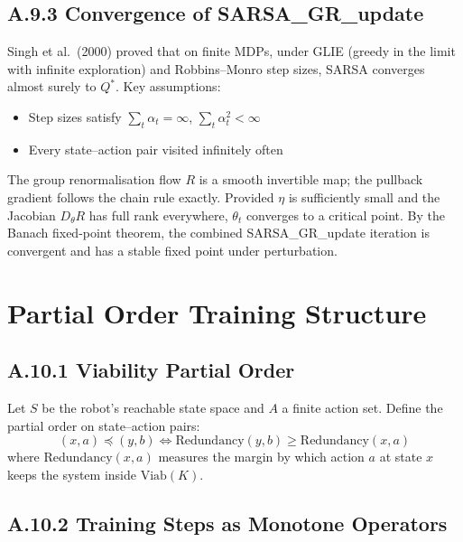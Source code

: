 \documentclass[11pt,a4paper]{article}
\theoremstyle{definition}
\theoremstyle{remark}
\newcommand{\Viab}{\mathrm{Viab}}
\begin{document}
\subsection{A.9.3 Convergence of SARSA\_GR\_update}

Singh et al.\ (2000) proved that on finite MDPs, under GLIE (greedy in the limit with infinite exploration) and Robbins--Monro step sizes, SARSA converges almost surely to $Q^*$. Key assumptions:
\begin{itemize}[nosep]
  \item Step sizes satisfy $\sum_t \alpha_t = \infty$, $\sum_t \alpha_t^2 < \infty$
  \item Every state--action pair visited infinitely often
\end{itemize}
The group renormalisation flow $R$ is a smooth invertible map; the pullback gradient follows the chain rule exactly. Provided $\eta$ is sufficiently small and the Jacobian $D_\theta R$ has full rank everywhere, $\theta_t$ converges to a critical point. By the Banach fixed-point theorem, the combined SARSA\_GR\_update iteration is convergent and has a stable fixed point under perturbation.


\section{Partial Order Training Structure}

\subsection{A.10.1 Viability Partial Order}

Let $S$ be the robot's reachable state space and $A$ a finite action set. Define the partial order on state--action pairs:
\[
  (x, a) \preceq (y, b) \iff \mathrm{Redundancy}(y,b) \geq \mathrm{Redundancy}(x,a)
\]
where $\mathrm{Redundancy}(x,a)$ measures the margin by which action $a$ at state $x$ keeps the system inside $\Viab(K)$.


\subsection{A.10.2 Training Steps as Monotone Operators}
\end{document}
